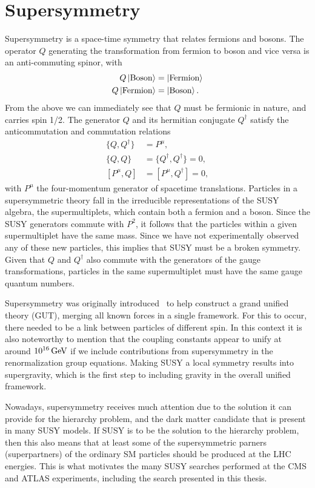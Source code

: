 \chapter{Supersymmetry \label{chap:supersymmetry}}

Supersymmetry is a space-time symmetry that relates fermions and bosons. The operator $Q$
generating the transformation from fermion to boson and vice versa is an anti-commuting spinor, with
\begin{align}
  Q \Ket{\textrm{Boson}} &= \Ket{\textrm{Fermion}} \\
  Q \Ket{\textrm{Fermion}} &= \Ket{\textrm{Boson}} .
\end{align}
From the above we can immediately see that $Q$ must be fermionic in nature, and carries spin 1/2. 
The generator $Q$ and its hermitian conjugate $Q^\dagger$ satisfy the anticommutation and
commutation relations
\begin{align}
  \{Q,Q^\dagger\} &= P^\mu ,\\
  \{Q,Q\} &= \{Q^\dagger,Q^\dagger\} = 0, \\
  \left[P^\mu,Q\right] &= \left[P^\mu,Q^\dagger\right] = 0 ,
\end{align}
with $P^\mu$ the four-momentum generator of spacetime translations. 
Particles in a supersymmetric theory fall in the irreducible representations of the SUSY algebra,
the supermultiplets, which contain both a fermion and a boson. 
Since the SUSY generators commute with $P^2$, it follows that the particles within a given
supermultiplet have the same mass. Since we have not experimentally observed any of these new
particles, this implies that SUSY must be a broken symmetry. 
Given that $Q$ and $Q^\dagger$ also commute with the generators of the gauge transformations, 
particles in the same supermultiplet must have the same gauge quantum numbers. 

Supersymmetry was originally introduced~\cite{Wess,Golfand,Chamseddine,Kane,Fayet,Barbieri,Hall} to
help construct a grand unified theory (GUT), merging all known forces in a single framework. For
this to occur, there needed to be a link between particles of different spin. In this context it is
also noteworthy to mention that the coupling constants appear to unify at around
$\text{10}^\text{16}\,\text{Ge\hspace{-.08em}V}$ if we include contributions from supersymmetry in the renormalization
group equations. Making SUSY a local symmetry results into supergravity, which is the first step to
including gravity in the overall unified framework. 

Nowadays, supersymmetry receives much attention due to the solution it can provide for the
hierarchy problem, and the dark matter candidate that is present in many SUSY models. If SUSY is to
be the solution to the hierarchy problem, then this also means that at least some of the
supersymmetric parners (superpartners) of the ordinary SM particles should be produced at the LHC
energies. This is what motivates the many SUSY searches performed at the CMS and ATLAS experiments,
including the search presented in this thesis. 

